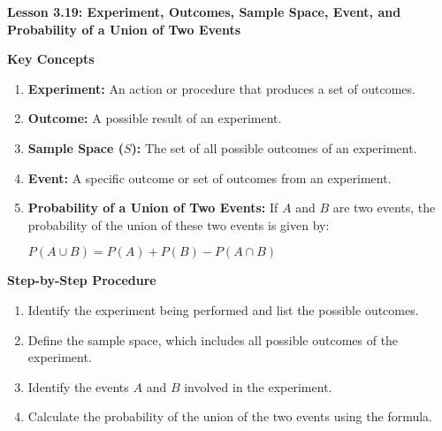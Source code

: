 \begin{center}
\textbf{Lesson 3.19: Experiment, Outcomes, Sample Space, Event, and Probability of a Union of Two Events}
\end{center}

\vspace*{-1.5ex}

\noindent\textbf{Key Concepts}

\begin{enumerate}[label=\color{blue}\arabic*.]
    \item \textbf{Experiment:} An action or procedure that produces a set of outcomes.
    \item \textbf{Outcome:} A possible result of an experiment.
    \item \textbf{Sample Space (\(S\)):} The set of all possible outcomes of an experiment.
    \item \textbf{Event:} A specific outcome or set of outcomes from an experiment.
    \item \textbf{Probability of a Union of Two Events:} If \(A\) and \(B\) are two events, the probability of the union of these two events is given by:

{\centering $ P(A \cup B) = P(A) + P(B) - P(A \cap B) $\par}
\end{enumerate}

\noindent\textbf{Step-by-Step Procedure}

\begin{enumerate}
    \item Identify the experiment being performed and list the possible outcomes.
    \item Define the sample space, which includes all possible outcomes of the experiment.
    \item Identify the events \(A\) and \(B\) involved in the experiment.
    \item Calculate the probability of the union of the two events using the formula.
\end{enumerate}
